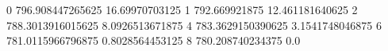 0 796.908447265625 16.69970703125
1 792.669921875 12.461181640625
2 788.3013916015625 8.0926513671875
4 783.3629150390625 3.1541748046875
6 781.0115966796875 0.8028564453125
8 780.208740234375 0.0
